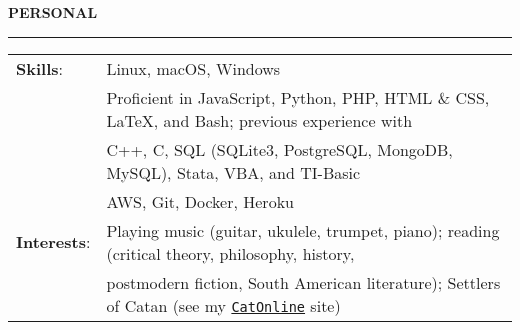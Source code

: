 \documentclass[paper=a4, fontsize=11pt]{scrartcl} %
\newenvironment{mycenter}[1][\topsep]
  {\setlength{\topsep}{#1}\par\kern\topsep\centering}%
  {\par\kern\topsep}%
\begin{document}
\begin{mycenter}[0pt]
\textsc{\textbf{PERSONAL}}
\end{mycenter}

\rule{\textwidth}{0.4pt}

\vspace{1.5mm}

\begin{tabularx}{\linewidth}{ll}

\hspace{-3mm}
\textbf{Skills}: & Linux, macOS, Windows \\
  & Proficient in JavaScript, Python, PHP, HTML \& CSS, \LaTeX, and Bash; previous experience with \\
  & C++, C, SQL (SQLite3, PostgreSQL, MongoDB, MySQL), Stata, VBA, and TI-Basic \\
  & AWS, Git, Docker, Heroku\\[1mm]

\hspace{-3mm}
\textbf{Interests}: & Playing music (guitar, ukulele, trumpet, piano); reading (critical theory, philosophy, history, \\
 & postmodern fiction, South American literature); Settlers of Catan (see my \texttt{\href{http://catonline.murp.us/}{CatOnline}} site) \\[1mm]

\end{tabularx}
\end{document}
